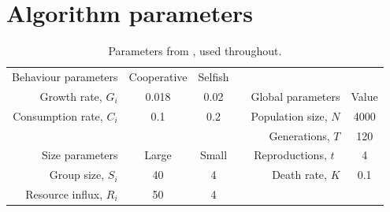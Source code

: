 \documentclass[11pt]{article}
\begin{document}
\section{Algorithm parameters}
\label{app:parameters}
\vspace{-.5cm}
\begin{table}[!ht]
  \centering
  \begin{tabular}{r|c|ccr|c}
  Behaviour parameters  & Cooperative & Selfish &  & \multicolumn{1}{c}{} & \\ \cline{1-3}
  Growth rate, $G_i$      & 0.018     & 0.02    &  & Global parameters  & Value\\ \cline{5-6}
  Consumption rate, $C_i$   & 0.1     & 0.2   &  & Population size, $N$ & 4000\\
  \multicolumn{1}{r}{} & \multicolumn{1}{c}{} & \multicolumn{1}{c}{} &  & Generations, $T$ & 120 \\
  Size parameters   & Large     & Small   &  & Reproductions, $t$~    & 4\\ \cline{1-3}
  Group size, $S_i$     & 40      & 4     &  & Death rate, $K$ & 0.1\\
  Resource influx, $R_i$    & 50      & 4     &  & \multicolumn{1}{c}{} & \\
  \end{tabular}
  \caption{Parameters from \cite{orig}, used throughout.}
  \label{table:param}
\end{table}
\end{document}
